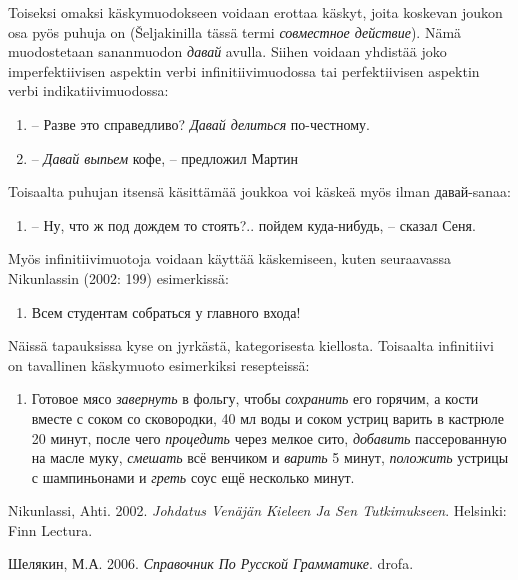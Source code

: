 \documentclass[]{scrartcl}
\providecommand{\tightlist}{%
  \setlength{\itemsep}{0pt}\setlength{\parskip}{0pt}}
\begin{document}
Toiseksi omaksi käskymuodokseen voidaan erottaa käskyt, joita koskevan
joukon osa pyös puhuja on (Šeljakinilla tässä termi \emph{совместное
действие}). Nämä muodostetaan sananmuodon \emph{давай} avulla. Siihen
voidaan yhdistää joko imperfektiivisen aspektin verbi
infinitiivimuodossa tai perfektiivisen aspektin verbi
indikatiivimuodossa:

\begin{enumerate}
\def\labelenumi{(\arabic{enumi})}
\setcounter{enumi}{8}
\tightlist
\item
  -- Разве это справедливо? \emph{Давай делиться} по-честному.
\item
  -- \emph{Давай выпьем} кофе, -- предложил Мартин
\end{enumerate}

Toisaalta puhujan itsensä käsittämää joukkoa voi käskeä myös ilman
давай-sanaa:

\begin{enumerate}
\def\labelenumi{(\arabic{enumi})}
\setcounter{enumi}{10}
\tightlist
\item
  -- Ну, что ж под дождем то стоять?.. пойдем куда-нибудь, -- сказал
  Сеня.
\end{enumerate}

Myös infinitiivimuotoja voidaan käyttää käskemiseen, kuten seuraavassa
Nikunlassin (2002: 199) esimerkissä:

\begin{enumerate}
\def\labelenumi{(\arabic{enumi})}
\setcounter{enumi}{11}
\tightlist
\item
  Всем студентам собраться у главного входа!
\end{enumerate}

Näissä tapauksissa kyse on jyrkästä, kategorisesta kiellosta. Toisaalta
infinitiivi on tavallinen käskymuoto esimerkiksi resepteissä:

\begin{enumerate}
\def\labelenumi{(\arabic{enumi})}
\setcounter{enumi}{12}
\tightlist
\item
  Готовое мясо \emph{завернуть} в фольгу, чтобы \emph{сохранить} его
  горячим, а кости вместе с соком со сковородки, 40 мл воды и соком
  устриц варить в кастрюле 20 минут, после чего \emph{процедить} через
  мелкое сито, \emph{добавить} пассерованную на масле муку,
  \emph{смешать} всё венчиком и \emph{варить} 5 минут, \emph{положить}
  устрицы с шампиньонами и \emph{греть} соус ещё несколько минут.
\end{enumerate}

Nikunlassi, Ahti. 2002. \emph{Johdatus Venäjän Kieleen Ja Sen
Tutkimukseen}. Helsinki: Finn Lectura.

Шелякин, М.А. 2006. \emph{Справочник По Русской Грамматике}. drofa.
\end{document}
